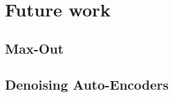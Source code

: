 \chapter {Future work}
\label{chap:futurework}

	\section{Max-Out}
	\section{Denoising Auto-Encoders}